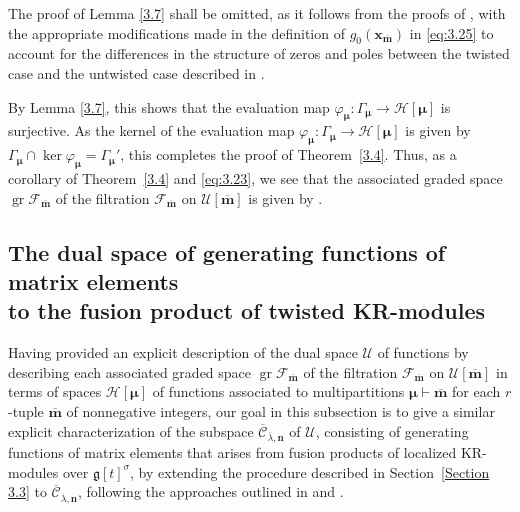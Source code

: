 \documentclass[10pt,a4paper]{amsart}
\numberwithin{equation}{section}
\DeclareMathOperator{\gr}{gr}
\begin{document}
The proof of Lemma \ref{3.7} shall be omitted, as it follows from the proofs of \cite[Lemmas 3.11, 3.13, and 3.15]{AKS06}, with the appropriate modifications made in the definition of $g_0(\mathbf{x}_{\overline{\mathbf{m}}})$ in \eqref{eq:3.25} to account for the differences in the structure of zeros and poles between the twisted case and the untwisted case described in \cite{AK07,AKS06}.

By Lemma \ref{3.7}, this shows that the evaluation map $\varphi_{\bm{\mu}}\colon \Gamma_{\bm{\mu}}\to\mathcal{H}[\bm{\mu}]$ is surjective. As the kernel of the evaluation map $\varphi_{\bm{\mu}}\colon \Gamma_{\bm{\mu}}\to\mathcal{H}[\bm{\mu}]$ is given by $\Gamma_{\bm{\mu}}\cap\ker \varphi_{\bm{\mu}}=\Gamma_{\bm{\mu}}'$, this completes the proof of Theorem~\ref{3.4}. Thus, as a corollary of Theorem~\ref{3.4} and \eqref{eq:3.23}, we see that the associated graded space $\gr\mathcal{F}_{\overline{\mathbf{m}}}$ of the filtration $\mathcal{F}_{\overline{\mathbf{m}}}$ on $\mathcal{U}[\overline{\mathbf{m}}]$ is given by
\smash{$
\gr\mathcal{F}_{\overline{\mathbf{m}}}
=\bigoplus_{\bm{\mu}\vdash\overline{\mathbf{m}}}\mathcal{H}[\bm{\mu}]$}.

\subsection[The dual space of generating functions of matrix elements to the fusion product of twisted KR-modules]{The dual space of generating functions of matrix elements\\ to the fusion product of twisted KR-modules}\label{Section 3.4}

Having provided an explicit description of the dual space $\mathcal{U}$ of functions by describing each associated graded space $\gr\mathcal{F}_{\overline{\mathbf{m}}}$ of the filtration $\mathcal{F}_{\overline{\mathbf{m}}}$ on $\mathcal{U}[\overline{\mathbf{m}}]$ in terms of spaces $\mathcal{H}[\bm{\mu}]$ of functions associated to multipartitions $\bm{\mu}\vdash\overline{\mathbf{m}}$ for each $r$-tuple $\overline{\mathbf{m}}$ of nonnegative integers, our goal in this subsection is to give a similar explicit characterization of the subspace $\overline{\mathcal{C}}_{ \overline{\lambda},\mathbf{n}}$ of $\mathcal{U}$, consisting of generating functions of matrix elements that arises from fusion products of localized KR-modules over $\mathfrak{g}[t]^{\sigma}$, by extending the procedure described in Section~\ref{Section 3.3} to $\overline{\mathcal{C}}_{ \overline{\lambda},\mathbf{n}}$, following the approaches outlined in \cite[Section~5.5]{AKS06} and \cite[Section~5.2]{AK07}.
\end{document}
